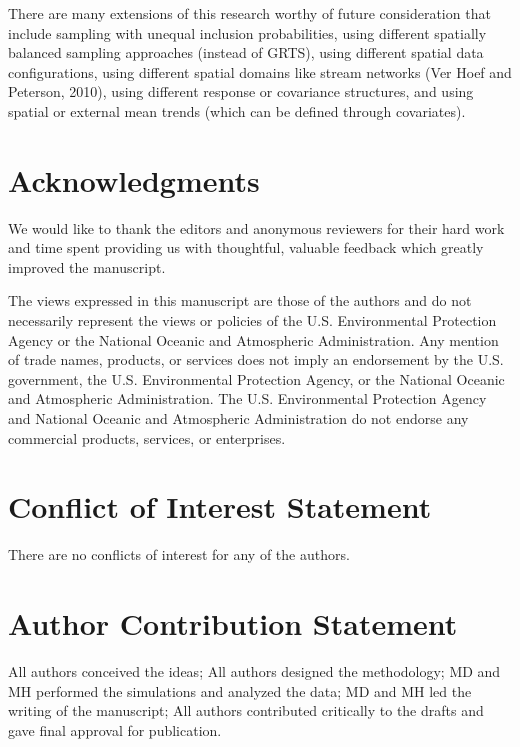 \documentclass[]{elsarticle} %
\begin{document}
There are many extensions of this research worthy of future
consideration that include sampling with unequal inclusion
probabilities, using different spatially balanced sampling approaches
(instead of GRTS), using different spatial data configurations, using
different spatial domains like stream networks (Ver Hoef and Peterson,
2010), using different response or covariance structures, and using
spatial or external mean trends (which can be defined through
covariates).

\hypertarget{acknowledgments}{%
\section*{Acknowledgments}\label{acknowledgments}}

We would like to thank the editors and anonymous reviewers for their
hard work and time spent providing us with thoughtful, valuable feedback
which greatly improved the manuscript.

The views expressed in this manuscript are those of the authors and do
not necessarily represent the views or policies of the U.S.
Environmental Protection Agency or the National Oceanic and Atmospheric
Administration. Any mention of trade names, products, or services does
not imply an endorsement by the U.S. government, the U.S. Environmental
Protection Agency, or the National Oceanic and Atmospheric
Administration. The U.S. Environmental Protection Agency and National
Oceanic and Atmospheric Administration do not endorse any commercial
products, services, or enterprises.

\hypertarget{conflict-of-interest-statement}{%
\section*{Conflict of Interest
Statement}\label{conflict-of-interest-statement}}

There are no conflicts of interest for any of the authors.

\hypertarget{author-contribution-statement}{%
\section*{Author Contribution
Statement}\label{author-contribution-statement}}

All authors conceived the ideas; All authors designed the methodology;
MD and MH performed the simulations and analyzed the data; MD and MH led
the writing of the manuscript; All authors contributed critically to the
drafts and gave final approval for publication.
\end{document}
